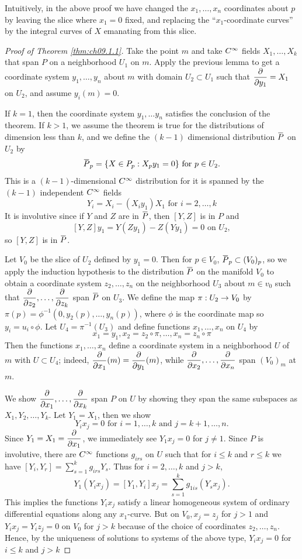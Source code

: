 \documentclass[../main]{subfiles}
\begin{document}
Intuitively, in the above proof we have changed the $x_1,\dots,x_n$ coordinates about $p$ by leaving the slice where $x_1=0$ fixed, and replacing the ``$x_1$-coordinate curves'' by the integral curves of $X$ emanating from this slice.
\begin{proof}[Proof of Theorem \ref{thm:ch09.1.1}]
Take the point $m$ and take $C^\infty$ fields $X_1,\dots,X_k$ that span $P$ on a neighborhood $U_1$ on $m$. Apply the previous lemma to get a coordinate system $y_1,\dots,y_n$ about $m$ with domain $U_2\subset U_1$ such that $\dfrac{\partial }{\partial y_1}=X_1$ on $U_2$, and assume $y_i(m)=0$.

If $k=1$, then the coordinate system $y_1,\dots y_n$ satisfies the conclusion of the theorem. If $k>1$, we assume the theorem is true for the distributions of dimension less than $k$, and we define the $(k-1)$ dimensional distribution $\xoverline{P}$ on $U_2$ by \[\xoverline{P}_p = \{X\in P_p: X_py_1=0\}\text{ for } p\in U_2.\] This is a $(k-1)$-dimensional $C^\infty$ distribution for it is spanned by the $(k-1)$ independent $C^\infty$ fields \[Y_i =X_i-(X_iy_1)X_1 \text{ for } i=2,\dots,k\]
It is involutive since if $Y$ and $Z$ are in $\xoverline{P}$, then $[Y,Z]$ is in $P$ and \[[Y,Z]y_1 = Y(Zy_1)-Z(Yy_1)=0\text{ on } U_2,\] so $[Y,Z]$ is in $\xoverline{P}$.

Let $V_0$ be the slice of $U_2$ defined by $y_1=0$. Then for $p\in V_0$, $\xoverline{P}_p\subset (V_0)_p$, so we apply the induction hypothesis to the distribution $\xoverline{P}$ on the manifold $V_0$ to obtain a coordinate system $z_2,\dots,z_n$ on the neighborhood $U_3$ about $m\in v_0$ such that $\dfrac{\partial }{\partial z_2},\dots,\dfrac{\partial }{\partial z_k}$ span $\xoverline{P}$ on $U_3$. We define the map $\pi: U_2\to V_0$ by $\pi(p)=\phi^{-1}(0,y_2(p),\dots,y_n(p))$, where $\phi$ is the coordinate map so $y_i=u_i\circ \phi$. Let $U_4 = \pi^{-1}(U_3)$ and define functions $x_1,\dots,x_n$ on $U_4$ by \[x_1=y_1, x_2= z_2\circ \pi,\dots,x_n=z_n\circ \pi\] Then the functions $x_1,\dots,x_n$ define a coordinate system in a neighborhood $U$ of $m$ with $U\subset U_4$; indeed, $\dfrac{\partial }{\partial x_1}(m) = \dfrac{\partial }{\partial y_1}(m)$, while $\dfrac{\partial }{\partial x_2},\dots, \dfrac{\partial }{\partial x_n}$ span $(V_0)_m$ at $m$.

We show $\dfrac{\partial }{\partial x_1},\dots ,\dfrac{\partial }{\partial x_k}$ span $P$ on $U$ by showing they span the same subspaces as $X_1,Y_2,\dots,Y_k$. Let $Y_1=X_1$, then we show \[Y_ix_j =0 \text{ for } i=1,\dots,k\text{ and } j=k+1,\dots,n.\] Since $Y_1=X_1=\dfrac{\partial }{\partial x_1}$, we immediately see $Y_1x_j=0$ for $j\neq 1$. Since $P$ is involutive, there are $C^\infty$ functions $g_{irs}$ on $U$ such that for $i\leq k$ and $r\leq k$ we have $[Y_i,Y_r] = \sum_{s=1}^k g_{irs}Y_s$. Thus for $i=2,\dots,k$ and $j>k$, \[Y_1(Y_ix_j) = [Y_1,Y_i]x_j = \sum_{s=1}^k g_{1is}(Y_sx_j).\]
This implies the functions $Y_ix_j$ satisfy a linear homogeneous system of ordinary differential equations along any $x_1$-curve. But on $V_0,x_j=z_j$ for $j>1$ and $Y_ix_j=Y_iz_j=0$ on $V_0$ for $j>k$ because of the choice of coordinates $z_2,\dots,z_n$. Hence, by the uniqueness of solutions to systems of the above type, $Y_ix_j=0$ for $i\leq k$ and $j>k$
\end{proof}
\end{document}
